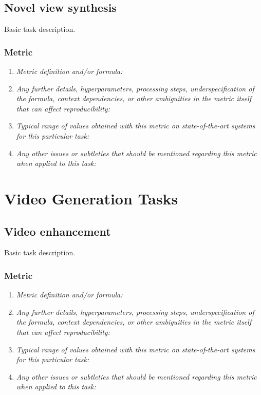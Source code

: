 \documentclass[a4paper,11pt]{article}
\begin{document}
    \subsection{Novel view synthesis} \label{novel_view_synthesis}
    Basic task description.
    \subsubsection{Metric}
        \begin{enumerate}[label=\alph*.]
            \item \textit{Metric definition and/or formula:}
            \bigskip
            \item \textit{Any further details, hyperparameters, processing steps, underspecification of the formula, context dependencies, or other ambiguities in the metric itself that can affect reproducibility:}
            \bigskip
            \item \textit{Typical range of values obtained with this metric on state-of-the-art systems for this particular task:}
            \bigskip
            \item \textit{Any other issues or subtleties that should be mentioned regarding this metric when applied to this task:}
            \bigskip
        \end{enumerate}

\clearpage
\section{Video Generation Tasks}
    \subsection{Video enhancement}
        Basic task description.
        \subsubsection{Metric}
            \begin{enumerate}[label=\alph*.]
                \item \textit{Metric definition and/or formula:}
                \bigskip
                \item \textit{Any further details, hyperparameters, processing steps, underspecification of the formula, context dependencies, or other ambiguities in the metric itself that can affect reproducibility:}
                \bigskip
                \item \textit{Typical range of values obtained with this metric on state-of-the-art systems for this particular task:}
                \bigskip
                \item \textit{Any other issues or subtleties that should be mentioned regarding this metric when applied to this task:}
                \bigskip
            \end{enumerate}
\end{document}
